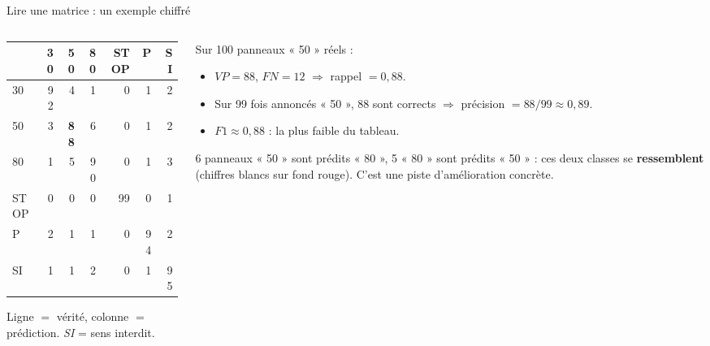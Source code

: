 \begin{frame}[fragile]{Lire une matrice : un exemple chiffré}
\begin{columns}[t]
\begin{column}{0.50\textwidth}
\begin{center}
\scriptsize
\begin{tabular}{@{}l|rrrrrr@{}}
\toprule
& 30 & 50 & 80 & STOP & P & SI \\
\midrule
30    & 92 & 4 & 1 & 0 & 1 & 2 \\
50    & 3 & \textbf{88} & 6 & 0 & 1 & 2 \\
80    & 1 & 5 & 90 & 0 & 1 & 3 \\
STOP  & 0 & 0 & 0 & 99 & 0 & 1 \\
P     & 2 & 1 & 1 & 0 & 94 & 2 \\
SI    & 1 & 1 & 2 & 0 & 1 & 95 \\
\bottomrule
\end{tabular}
\end{center}
\vspace{1mm}
{\scriptsize Ligne $=$ vérité, colonne $=$ prédiction. \emph{SI} = sens interdit.}
\end{column}
\begin{column}{0.46\textwidth}
\begin{kbox}
Sur 100 panneaux « 50 » réels :
\begin{itemize}
  \item $VP = 88$, $FN = 12$ $\Rightarrow$ rappel $= 0{,}88$.
  \item Sur 99 fois annoncés « 50 », 88 sont corrects
  $\Rightarrow$ précision $= 88/99 \approx 0{,}89$.
  \item $F1 \approx 0{,}88$ : la plus faible du tableau.
\end{itemize}
\end{kbox}
\begin{wbox}[Diagnostic]
6 panneaux « 50 » sont prédits « 80 », 5 « 80 » sont prédits « 50 » : ces deux
classes se \textbf{ressemblent} (chiffres blancs sur fond rouge). C'est une piste
d'amélioration concrète.
\end{wbox}
\end{column}
\end{columns}
\end{frame}

